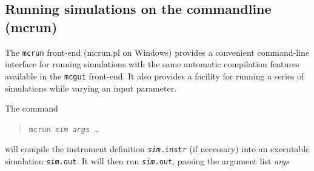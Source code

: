 \subsection{Running simulations on the commandline (mcrun)}
\label{s:mcrun}

The \verb+mcrun+ front-end (mcrun.pl on Windows) provides a convenient
command-line interface for running simulations with the same automatic
compilation features available in the \verb+mcgui+ front-end. It also provides a
facility for running a series of simulations while varying an input parameter.

The command
\begin{quote}
  \texttt{mcrun {\it sim} {\it args\/} \ldots}
\end{quote}
will compile the instrument definition \texttt{{\it sim}.instr} (if
necessary) into an executable simulation \texttt{{\it sim}.out}. It
will then run \texttt{{\it sim}.out}, passing the argument list {\it
  args}

